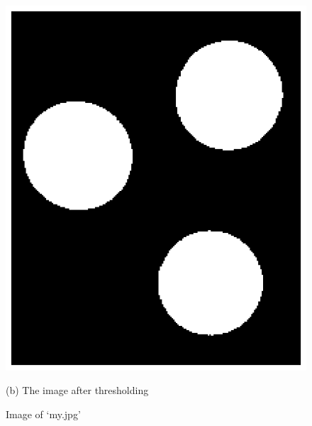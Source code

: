 \documentclass[a4paper]{article}
\begin{document}
\begin{figure}[h]
\begin{minipage}[h]{0.5\linewidth}
		\includegraphics{program/1/figure/my-threshold.eps}
		\caption*{(b) The image after thresholding}
		\label{subfigure:my-threshold}
	\end{minipage}
	\caption{Image of `my.jpg'}\label{figure:my image}
\end{figure}
\end{document}
